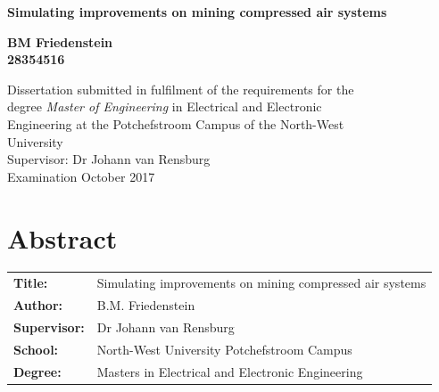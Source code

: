 \documentclass[12pt, english, oneside, open=any,draft=true ]{report}%
\begin{document}
\begin{titlepage}
	\BgThispage	
		\vspace{0cm}
		\begin{center}
			\textbf{\singlespacing\huge{Simulating improvements on mining compressed air systems}\\
			}\par
			\vspace{3cm}
			\LARGE{ \textbf{BM Friedenstein \\28354516} }
		\end{center}
	
	\vspace{2cm}
	
\begin{flushleft}
	{\singlespacing\centering \Large Dissertation submitted in fulfilment of the requirements for the \\ degree {\color{MasterBlue} \textit{Master of Engineering}} in {\color{MasterBlue}Electrical and Electronic \\ Engineering} at the Potchefstroom Campus of the North-West\\ University\\
	}
	\vspace{2cm}
	{\large \setlength{\parindent}{0.5cm} Supervisor: Dr Johann van Rensburg \\
	\vspace{1cm}
	\large{Examination October 2017}\\		
	}
\end{flushleft}
\end{titlepage}
\clearpage

{\tiny }\section*{Abstract}
	\thispagestyle{plain}
	\vspace{0.2cm}
	\begin{tabular}{p{2.35cm}p{13cm}}
		\textbf{Title:} & Simulating improvements on mining compressed air systems  \\
		\textbf{Author:} & B.M. Friedenstein \\
		\textbf{Supervisor:} & Dr Johann van Rensburg \\
		\textbf{School:} & North-West University Potchefstroom Campus\\
		\textbf{Degree:} & Masters in Electrical and Electronic Engineering \\
	\end{tabular}
	\vspace{1cm}
\end{document}
